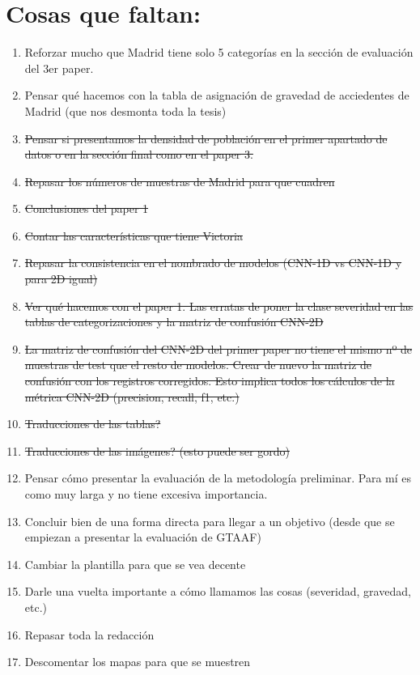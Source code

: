 \documentclass{uathesis-es}
\begin{document}
{\section{Cosas que faltan:}
\begin{enumerate}
    \item Reforzar mucho que Madrid tiene solo 5 categorías en la sección de evaluación del 3er paper.
    \item Pensar qué hacemos con la tabla de asignación de gravedad de acciedentes de Madrid (que nos desmonta toda la tesis)
    \item \sout{Pensar si presentamos la densidad de población en el primer apartado de datos o en la sección final como en el paper 3.}
    \item \sout{Repasar los números de muestras de Madrid para que cuadren}
    \item \sout{Conclusiones del paper 1}
    \item \sout{Contar las características que tiene Victoria}
    \item \sout{Repasar la consistencia en el nombrado de modelos (CNN-1D vs CNN-1D y para 2D igual)}
    \item \sout{Ver qué hacemos con el paper 1. Las erratas de poner la clase severidad en las tablas de categorizaciones y la matriz de confusión CNN-2D}
    \item \sout{La matriz de confusión del CNN-2D del primer paper no tiene el mismo nº de muestras de test que el resto de modelos. Crear de nuevo la matriz de confusión con los registros corregidos. Esto implica todos los cálculos de la métrica CNN-2D (precision, recall, f1, etc.)}
    \item \sout{Traducciones de las tablas?}
    \item \sout{Traducciones de las imágenes? (esto puede ser gordo)}
    \item Pensar cómo presentar la evaluación de la metodología preliminar. Para mí es como muy larga y no tiene excesiva importancia.
    \item Concluir bien de una forma directa para llegar a un objetivo (desde que se empiezan a presentar la evaluación de GTAAF)
    \item Cambiar la plantilla para que se vea decente
    \item Darle una vuelta importante a cómo llamamos las cosas (severidad, gravedad, etc.)
    \item Repasar toda la redacción
    \item Descomentar los mapas para que se muestren
\end{enumerate}

}
\end{document}
